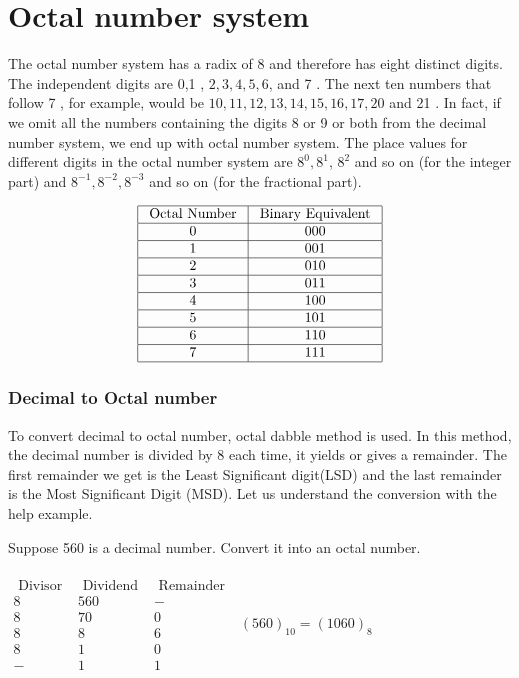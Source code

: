 \section{Octal number system}
The octal number system has a radix of 8 and therefore has eight distinct digits. The independent digits are 0,1 , $2,3,4,5,6$, and 7 . The next ten numbers that follow 7 , for example, would be $10,11,12,13,14,15,16,17,20$ and 21 . In fact, if we omit all the numbers containing the digits 8 or 9 or both from the decimal number system, we end up with octal number system. The place values for different digits in the octal number system are $8^{0}, 8^{1}$, $8^{2}$ and so on (for the integer part) and $8^{-1}, 8^{-2}, 8^{-3}$ and so on (for the fractional part). 

$$\begin{array}{|c|c|}
\hline \text { Octal Number } & \text { Binary Equivalent } \\
\hline 0 & 000 \\
\hline 1 & 001 \\
\hline 2 & 010 \\
\hline 3 & 011 \\
\hline 4 & 100 \\
\hline 5 & 101 \\
\hline 6 & 110 \\
\hline 7 & 111 \\
\hline
\end{array}$$



\subsubsection{Decimal to Octal number}
To convert decimal to octal number, octal dabble method is used. In this method, the decimal number is divided by 8 each time, it yields or gives a remainder. The first remainder we get is the Least Significant digit(LSD) and the last remainder is the Most  Significant Digit (MSD). Let us understand the conversion with the help example.

\begin{exercise}
	Suppose 560  is a decimal number. Convert it into an octal number.\\\\
	$\begin{array}{ccc}\text { Divisor } & \text { Dividend } & \text { Remainder } \\  8 & 560 & - \\ 8 & 70 & 0 \\ 8 & 8 & 6 \\ 8 & 1 & 0 \\ - & 1 & 1  \end{array}$\qquad
	$(560)_{10}=(1060)_{8}$
\end{exercise}


